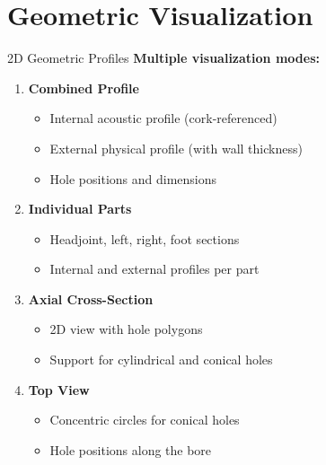 \documentclass[aspectratio=169,10pt]{beamer}
\begin{document}
\section{Geometric Visualization}

\begin{frame}{2D Geometric Profiles}
\textbf{Multiple visualization modes:}

\begin{enumerate}
    \item \textbf{Combined Profile}
    \begin{itemize}
        \item Internal acoustic profile (cork-referenced)
        \item External physical profile (with wall thickness)
        \item Hole positions and dimensions
    \end{itemize}
    
    \item \textbf{Individual Parts}
    \begin{itemize}
        \item Headjoint, left, right, foot sections
        \item Internal and external profiles per part
    \end{itemize}
    
    \item \textbf{Axial Cross-Section}
    \begin{itemize}
        \item 2D view with hole polygons
        \item Support for cylindrical and conical holes
    \end{itemize}
    
    \item \textbf{Top View}
    \begin{itemize}
        \item Concentric circles for conical holes
        \item Hole positions along the bore
    \end{itemize}
\end{enumerate}
\end{frame}
\end{document}
